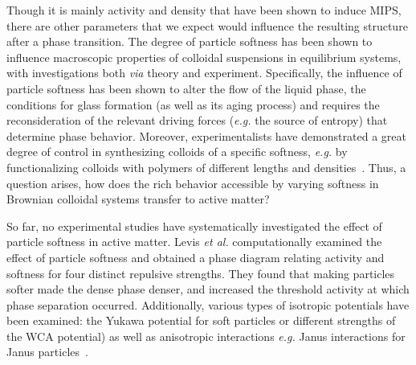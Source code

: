 \documentclass[twoside,twocolumn,9pt]{article}
\begin{document}
Though it is mainly activity and density that have been shown to induce MIPS\cite{Theurkauff2012}, there are other parameters that we expect would influence the resulting structure after a phase transition. The degree of particle softness has been shown to influence macroscopic properties of colloidal suspensions in equilibrium systems\cite{Vlassopoulos2012}, with investigations both \textit{via} theory\cite{Gnan2019TheColloids} and experiment\cite{Nigro2017,Seekell2015,Mattsson2009SoftGlasses}. Specifically, the influence of particle softness has been shown to alter the flow of the liquid phase\cite{Grand2008EffectsGlasses}, the conditions for glass formation (as well as its aging process\cite{Christopoulou2009AgeingGlasses}) and requires the reconsideration of the relevant driving forces (\textit{e.g.} the source of entropy) that determine phase behavior\cite{Vlassopoulos2012}. Moreover, experimentalists have demonstrated a great degree of control in synthesizing colloids of a specific softness, \textit{e.g.} by functionalizing colloids with polymers of different lengths and densities~\cite{Mahynski2015TuningMorphologies,Vlassopoulos2014TunableColloids}. Thus, a question arises, how does the rich behavior accessible by varying softness in Brownian colloidal systems transfer to active matter?

So far, no experimental studies have systematically investigated the effect of particle softness in active matter. Levis \textit{et al.} computationally examined the effect of particle softness and obtained a phase diagram relating activity and softness for four distinct repulsive strengths\cite{Levis2017}.
They found that making particles softer made the dense phase denser, and increased the threshold activity at which phase separation occurred. Additionally, various types of isotropic potentials have been examined: the Yukawa potential for soft particles\cite{Fily2012AthermalAlignment} or different strengths of the WCA potential\cite{Redner2016ClassicalAssembly,Stenhammar2014}) as well as anisotropic interactions \textit{e.g.} Janus interactions for Janus particles~\cite{Pu2017ReentrantInteraction}.
\end{document}
